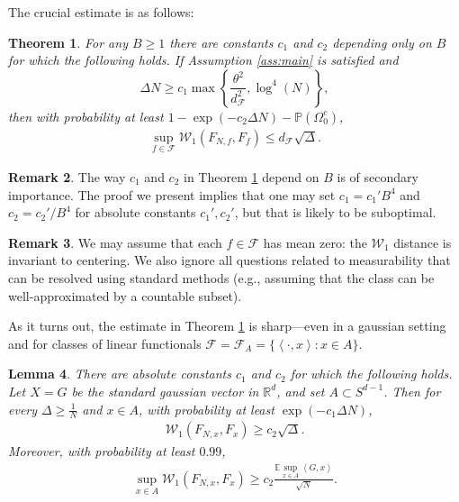 \documentclass[11pt]{amsart}
\newcommand{\R}{\mathbb{R}}
\newcommand{\inr}[1]{\left\langle #1 \right\rangle}
\newcommand{\W}{\mathcal{W}}
\newtheorem{theorem}{Theorem}[section]
\newtheorem{lemma}[theorem]{Lemma}
\theoremstyle{definition}
\newtheorem{remark}[theorem]{Remark}
\newcommand{\E}{\mathbb{E}}
\renewcommand{\P}{\mathbb{P}}
\numberwithin{equation}{section}
\begin{document}
The crucial estimate is as follows:
\begin{tcolorbox}
\begin{theorem}
\label{thm:main}
	For any $B\geq 1$  there are constants $c_{1}$ and $c_{2}$ depending only on $B$ for which the following holds.
	If  Assumption \ref{ass:main} is satisfied and 
	\[   \Delta  N  \geq c_{1}  \max\left\{ \frac{ \theta^{2} }{d_{\mathcal{F}}^{2 }  } ,  \log^{4}(N ) \right\}, \]
	then with probability at least $1-\exp(- c_{2}\Delta N) - \P(\Omega_{0}^c)$,
	\begin{align}
	\label{eq:main.thm.outcome}
	\sup_{f\in\mathcal{F}} \W_1(F_{N,f}, F_f)
	 \leq   d_{\mathcal{F}} \sqrt \Delta.
	 \end{align}
\end{theorem}
\end{tcolorbox}



\begin{remark}
The way $c_1$ and $c_2$ in Theorem \ref{thm:main} depend on $B$ is of secondary importance. The proof we present implies that one may set $c_1=c_1'B^4$ and $c_2=c_2'/B^4$ for absolute constants $c_1',c_2'$, but that is likely to be suboptimal.  
\end{remark}

\begin{remark}
We may assume that each $f\in\mathcal{F}$ has mean zero: the $\W_1$ distance is invariant to centering.
We also ignore all questions related to measurability that can be resolved using standard methods (e.g., assuming that the class can be well-approximated by a countable subset).
\end{remark}

As it turns out, the estimate in Theorem \ref{thm:main} is sharp---even in a gaussian setting and for classes of linear functionals $\mathcal{F}=\mathcal{F}_A=\{ \inr{\cdot,x} : x\in A\}$.




\begin{lemma}
\label{lem:optimality}
	There are absolute constants $c_{1}$ and $c_{2}$ for which the following holds.
	Let $X=G$ be the standard gaussian vector in $\R^d$, and set $A\subset S^{d-1}$.
	Then for every $\Delta \geq \frac{1}{N}$ and $x\in A$, with probability at least $\exp(-c_{1}\Delta N)$,
\begin{align*}
\W_1(F_{N,x}, F_{x})
\geq  c_{2}\sqrt\Delta.
\end{align*}
Moreover,  with probability at least $0.99$,
\begin{align*}
\sup_{x\in A} \W_1(F_{N,x}, F_{x})
	\geq c_{2}\frac{\E \sup_{x\in A} \inr{G,x}}{\sqrt N}.
\end{align*}
\end{lemma}
\end{document}
